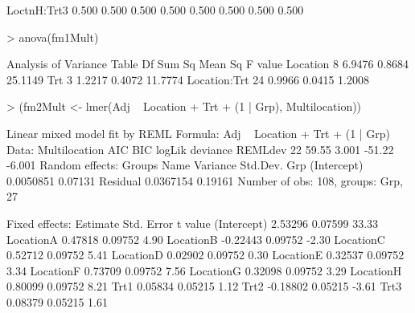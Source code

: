 \documentclass[12pt]{article}
\begin{document}
\begin{Schunk}
\begin{Soutput}
LoctnH:Trt3  0.500  0.500  0.500  0.500  0.500  0.500  0.500  0.500
\end{Soutput}
\begin{Sinput}
> anova(fm1Mult)
\end{Sinput}
\begin{Soutput}
Analysis of Variance Table
             Df Sum Sq Mean Sq F value
Location      8 6.9476  0.8684 25.1149
Trt           3 1.2217  0.4072 11.7774
Location:Trt 24 0.9966  0.0415  1.2008
\end{Soutput}
\begin{Sinput}
> (fm2Mult <- lmer(Adj ~ Location + Trt + (1 | Grp), Multilocation))
\end{Sinput}
\begin{Soutput}
Linear mixed model fit by REML 
Formula: Adj ~ Location + Trt + (1 | Grp) 
   Data: Multilocation 
 AIC   BIC logLik deviance REMLdev
  22 59.55  3.001   -51.22  -6.001
Random effects:
 Groups   Name        Variance  Std.Dev.
 Grp      (Intercept) 0.0050851 0.07131 
 Residual             0.0367154 0.19161 
Number of obs: 108, groups: Grp, 27

Fixed effects:
            Estimate Std. Error t value
(Intercept)  2.53296    0.07599   33.33
LocationA    0.47818    0.09752    4.90
LocationB   -0.22443    0.09752   -2.30
LocationC    0.52712    0.09752    5.41
LocationD    0.02902    0.09752    0.30
LocationE    0.32537    0.09752    3.34
LocationF    0.73709    0.09752    7.56
LocationG    0.32098    0.09752    3.29
LocationH    0.80099    0.09752    8.21
Trt1         0.05834    0.05215    1.12
Trt2        -0.18802    0.05215   -3.61
Trt3         0.08379    0.05215    1.61


\end{Soutput}
\end{Schunk}
\end{document}
